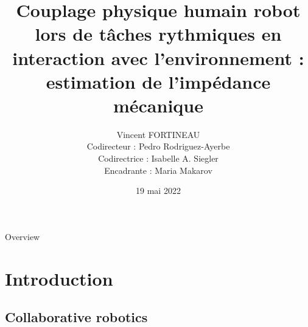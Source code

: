 \documentclass[10pt,xcolor=table]{beamer}
\author{Vincent FORTINEAU\\%
	{\footnotesize Codirecteur : Pedro Rodriguez-Ayerbe}\\%
	{\footnotesize Codirectrice : Isabelle A. Siegler}\\%
	{\footnotesize Encadrante : Maria Makarov}}
\title{Couplage physique humain robot lors de tâches rythmiques en interaction avec l’environnement : estimation de l’impédance mécanique}
\institute{Université Paris-Saclay}
\date{19 mai 2022}
\begin{document}
{
	\begin{frame}
		\titlepage
	\end{frame}	

	\begin{frame}{Overview}
		\tableofcontents[hideallsubsections]
	\end{frame}	
}
\section[Intro]{Introduction}

\subsection{Collaborative robotics}
\end{document}
